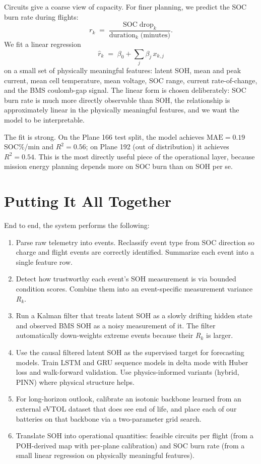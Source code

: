 \documentclass[11pt]{article}
\begin{document}
Circuits give a coarse view of capacity. For finer planning, we
predict the SOC burn rate during flights:
\begin{equation}
r_k \;=\; \frac{\mathrm{SOC \;drop}_k}{\mathrm{duration}_k\;\text{(minutes)}}.
\end{equation}
We fit a linear regression
\begin{equation}
\widehat{r}_k \;=\; \beta_0 + \sum_j \beta_j\, x_{k,j}
\end{equation}
on a small set of physically meaningful features: latent SOH, mean and
peak current, mean cell temperature, mean voltage, SOC range, current
rate-of-change, and the BMS coulomb-gap signal. The linear form is
chosen deliberately: SOC burn rate is much more directly observable
than SOH, the relationship is approximately linear in the physically
meaningful features, and we want the model to be interpretable.

The fit is strong. On the Plane 166 test split, the model achieves
\(\mathrm{MAE} = 0.19\) SOC\%/min and \(R^2 = 0.56\); on Plane 192 (out
of distribution) it achieves \(R^2 = 0.54\). This is the most directly
useful piece of the operational layer, because mission energy planning
depends more on SOC burn than on SOH per se.

\section{Putting It All Together}

End to end, the system performs the following:

\begin{enumerate}[leftmargin=*]
    \item Parse raw telemetry into events. Reclassify event type from
    SOC direction so charge and flight events are correctly identified.
    Summarize each event into a single feature row.
    \item Detect how trustworthy each event's SOH measurement is via
    bounded condition scores. Combine them into an event-specific
    measurement variance \(R_k\).
    \item Run a Kalman filter that treats latent SOH as a slowly
    drifting hidden state and observed BMS SOH as a noisy measurement
    of it. The filter automatically down-weights extreme events
    because their \(R_k\) is larger.
    \item Use the causal filtered latent SOH as the supervised target
    for forecasting models. Train LSTM and GRU sequence models in
    delta mode with Huber loss and walk-forward validation. Use
    physics-informed variants (hybrid, PINN) where physical structure
    helps.
    \item For long-horizon outlook, calibrate an isotonic backbone
    learned from an external eVTOL dataset that does see end of life,
    and place each of our batteries on that backbone via a two-parameter
    grid search.
    \item Translate SOH into operational quantities: feasible
    circuits per flight (from a POH-derived map with per-plane
    calibration) and SOC burn rate (from a small linear regression on
    physically meaningful features).
\end{enumerate}
\end{document}
